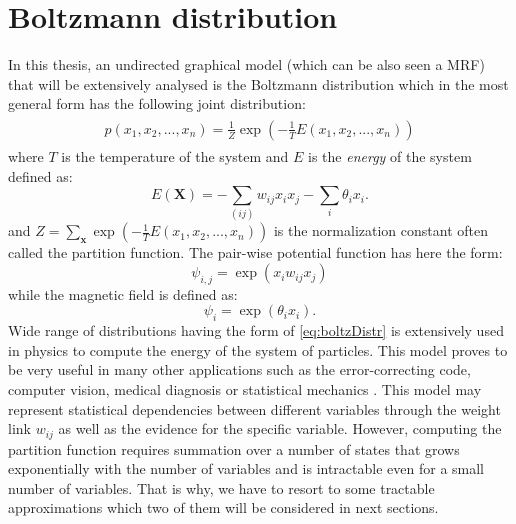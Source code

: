 \section{Boltzmann distribution}
In this thesis, an undirected graphical model (which can be also seen a MRF) that will be extensively analysed is the Boltzmann distribution which in the most general form has the following joint distribution:
\begin{align}
\begin{split}
p(x_1,x_2, ..., x_n) = \frac{1}{Z}\exp \left(-\frac{1}{T}E(x_1,x_2, ..., x_n) \right)
\end{split}
\label{eq:boltzDistr}
\end{align}
where $T$ is the temperature of the system and  $E$ is the \emph{energy} of the system defined as:
$$E(\mathbf{X}) = -\sum_{(ij)} w_{ij} x_i x_j -\sum_i  \theta_i x_i.$$
and $Z = \sum_{\mathbf{x}}\exp (-\frac{1}{T}E(x_1,x_2, ..., x_n))$  is the normalization constant often called the partition function. The pair-wise potential function has here the form:
$$\psi_{i,j} = \exp(x_i w_{ij} x_j)$$
while the magnetic field is defined as:
$$\psi_i = \exp(\theta_i x_i).$$
Wide range of distributions having the form of \ref{eq:boltzDistr} is extensively used in physics to compute the energy of the system of particles. This model proves to be very useful in many other applications such as the error-correcting code, computer vision, medical diagnosis or statistical mechanics \cite{yedidia2001idiosyncratic}. This model may represent statistical dependencies between different variables through the weight link $w_{ij}$ as well as the evidence for the specific variable. However, computing the partition function requires summation over a number of states that grows exponentially with the number of variables and is intractable even for a small number of variables. That is why, we have to resort to some tractable approximations which two of them will be considered in next sections. 

